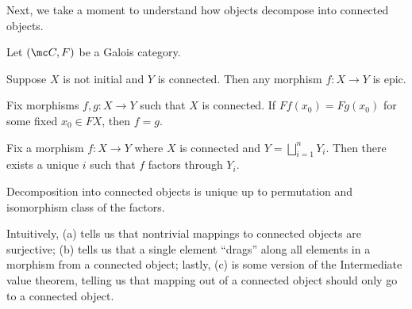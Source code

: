 \documentclass{amsart}
\begin{document}
Next, we take a moment to understand how objects decompose into connected objects.
\begin{lemma} \label{lem:connected-maps}
    Let $(\mc C,F)$ be a Galois category.
    \begin{listalph}
        \item Suppose $X$ is not initial and $Y$ is connected. Then any morphism $f\colon X\to Y$ is epic.
        \item Fix morphisms $f,g\colon X\to Y$ such that $X$ is connected. If $Ff(x_0)=Fg(x_0)$ for some fixed $x_0\in FX$, then $f=g$.
        \item Fix a morphism $f\colon X\to Y$ where $X$ is connected and $Y=\bigsqcup_{i=1}^nY_i$. Then there exists a unique $i$ such that $f$ factors through $Y_i$.
        \item Decomposition into connected objects is unique up to permutation and isomorphism class of the factors.
    \end{listalph}
\end{lemma}
Intuitively, (a) tells us that nontrivial mappings to connected objects are surjective; (b) tells us that a single element ``drags'' along all elements in a morphism from a connected object; lastly, (c) is some version of the Intermediate value theorem, telling us that mapping out of a connected object should only go to a connected object.
\end{document}
